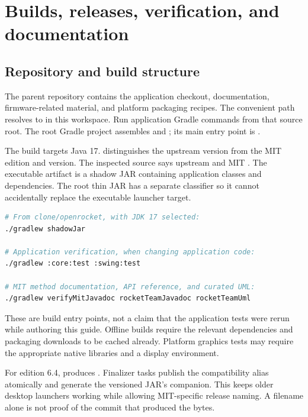\chapter{Builds, releases, verification, and documentation}\label{ch:build}
\section{Repository and build structure}
The parent repository contains the application checkout, documentation, firmware-related material, and platform packaging recipes. The convenient  path resolves to  in this workspace. Run application Gradle commands from that source root. The root Gradle project assembles  and ; its main entry point is .

The build targets Java 17.  distinguishes the upstream version from the MIT edition and version. The inspected source says upstream  and MIT . The executable artifact is a shadow JAR containing application classes and dependencies. The root thin JAR has a separate  classifier so it cannot accidentally replace the executable launcher target.

\begin{lstlisting}[language=bash]
# From clone/openrocket, with JDK 17 selected:
./gradlew shadowJar

# Application verification, when changing application code:
./gradlew :core:test :swing:test

# MIT method documentation, API reference, and curated UML:
./gradlew verifyMitJavadoc rocketTeamJavadoc rocketTeamUml
\end{lstlisting}

These are build entry points, not a claim that the application tests were rerun while authoring this guide. Offline builds require the relevant dependencies and packaging downloads to be cached already. Platform graphics tests may require the appropriate native libraries and a display environment.

For edition 6.4,  produces . Finalizer tasks publish the compatibility alias  atomically and generate the versioned JAR's  companion. This keeps older desktop launchers working while allowing MIT-specific release naming. A filename alone is not proof of the commit that produced the bytes.


